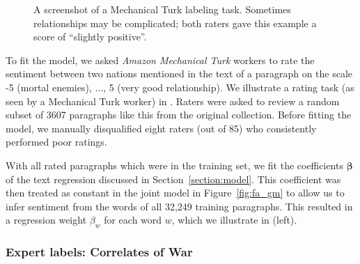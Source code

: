 \begin{figure}
  \setlength\fboxsep{0pt}
  \setlength\fboxrule{0.5pt}
  \center {}
  \label{fig:mechanical_turk_sample}
  \small\caption{A screenshot of a Mechanical Turk labeling task.
    Sometimes relationships may be complicated; both raters gave this
    example a score of ``slightly positive''.}
  \normalsize
\end{figure}

To fit the model, we asked \emph{Amazon Mechanical Turk} workers to
rate the sentiment between two nations mentioned in the text of a
paragraph on the scale -5 (mortal enemies), $\ldots$, 5 (very good
relationship). We illustrate a rating task (as seen by a Mechanical
Turk worker) in . Raters were asked to
review a random subset of 3607 paragraphs like this from the original
collection.  Before fitting the model, we manually disqualified eight
raters (out of 85) who consistently performed poor ratings.

With all rated paragraphs which were in the training set, we fit the
coefficients $\bm \beta$ of the text regression discussed in
Section~\ref{section:model}.  This coefficient was then treated as
constant in the joint model in Figure~\ref{fig:fa_gm} to allow us to
infer sentiment from the words of all 32,249 training paragraphs.
This resulted in a regression weight $\beta_w$ for each word $w$,
which we illustrate in  (left).

\subsubsection{Expert labels: Correlates of War}
\label{section:correlates_of_war}


